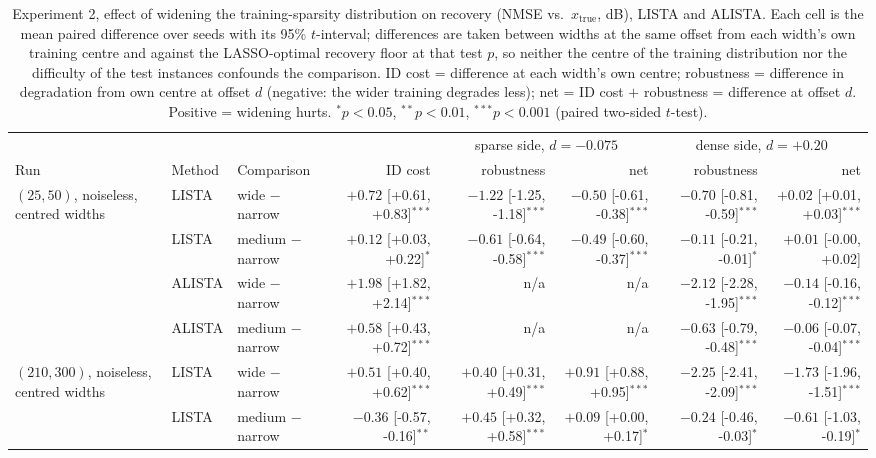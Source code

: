 \begin{table}[htbp]
\centering
\small
\caption{Experiment 2, effect of widening the training-sparsity distribution on recovery (NMSE vs.\ $x_\mathrm{true}$, dB), LISTA and ALISTA. Each cell is the mean paired difference over seeds with its 95\% $t$-interval; differences are taken between widths at the same offset from each width's own training centre and against the LASSO-optimal recovery floor at that test $p$, so neither the centre of the training distribution nor the difficulty of the test instances confounds the comparison. ID cost = difference at each width's own centre; robustness = difference in degradation from own centre at offset $d$ (negative: the wider training degrades less); net = ID cost $+$ robustness = difference at offset $d$. Positive = widening hurts. $^{*}p<0.05$, $^{**}p<0.01$, $^{***}p<0.001$ (paired two-sided $t$-test).}
\label{tab:exp2-width-tradeoff}
\begin{tabular}{@{} l l l r rr rr @{}}
\toprule
& & & & \multicolumn{2}{c}{sparse side, $d=-0.075$} & \multicolumn{2}{c}{dense side, $d=+0.20$} \\
\cmidrule(lr){5-6} \cmidrule(lr){7-8}
Run & Method & Comparison & ID cost & robustness & net & robustness & net \\
\midrule
$(25,50)$, noiseless, centred widths & LISTA & wide $-$ narrow & $+0.72$ [+0.61, +0.83]$^{***}$ & $-1.22$ [-1.25, -1.18]$^{***}$ & $-0.50$ [-0.61, -0.38]$^{***}$ & $-0.70$ [-0.81, -0.59]$^{***}$ & $+0.02$ [+0.01, +0.03]$^{***}$ \\
 & LISTA & medium $-$ narrow & $+0.12$ [+0.03, +0.22]$^{*}$ & $-0.61$ [-0.64, -0.58]$^{***}$ & $-0.49$ [-0.60, -0.37]$^{***}$ & $-0.11$ [-0.21, -0.01]$^{*}$ & $+0.01$ [-0.00, +0.02] \\
 & ALISTA & wide $-$ narrow & $+1.98$ [+1.82, +2.14]$^{***}$ & n/a & n/a & $-2.12$ [-2.28, -1.95]$^{***}$ & $-0.14$ [-0.16, -0.12]$^{***}$ \\
 & ALISTA & medium $-$ narrow & $+0.58$ [+0.43, +0.72]$^{***}$ & n/a & n/a & $-0.63$ [-0.79, -0.48]$^{***}$ & $-0.06$ [-0.07, -0.04]$^{***}$ \\
\addlinespace
$(210,300)$, noiseless, centred widths & LISTA & wide $-$ narrow & $+0.51$ [+0.40, +0.62]$^{***}$ & $+0.40$ [+0.31, +0.49]$^{***}$ & $+0.91$ [+0.88, +0.95]$^{***}$ & $-2.25$ [-2.41, -2.09]$^{***}$ & $-1.73$ [-1.96, -1.51]$^{***}$ \\
 & LISTA & medium $-$ narrow & $-0.36$ [-0.57, -0.16]$^{**}$ & $+0.45$ [+0.32, +0.58]$^{***}$ & $+0.09$ [+0.00, +0.17]$^{*}$ & $-0.24$ [-0.46, -0.03]$^{*}$ & $-0.61$ [-1.03, -0.19]$^{*}$ \\

\end{tabular}
\end{table}
